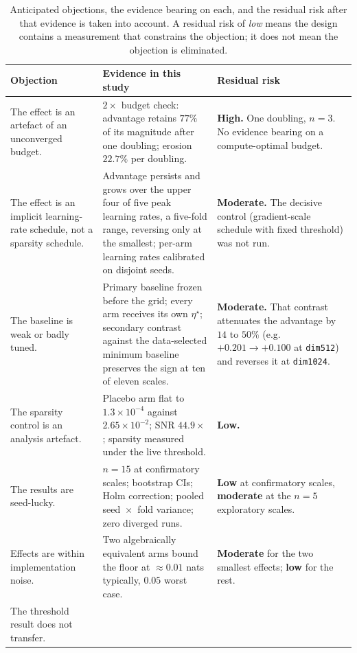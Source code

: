 \documentclass[final,5p,times,twocolumn]{elsarticle}
\theoremstyle{remark}
\begin{document}
\begin{table}[!tb]
\centering
\small
\caption{Anticipated objections, the evidence bearing on each, and the
residual risk after that evidence is taken into account. A residual risk of
\emph{low} means the design contains a measurement that constrains the
objection; it does not mean the objection is eliminated.}
\label{tab:threats}
\begin{tabular}{@{}p{3.0cm}p{4.9cm}p{4.3cm}@{}}
\toprule
Objection & Evidence in this study & Residual risk \\
\midrule
The effect is an artefact of an unconverged budget. &
$2\times$ budget check: advantage retains $77\%$ of its magnitude after one
doubling; erosion $22.7\%$ per doubling. &
\textbf{High.} One doubling, $n=3$. No evidence bearing on a compute-optimal
budget. \\
\addlinespace
The effect is an implicit learning-rate schedule, not a sparsity schedule. &
Advantage persists and grows over the upper four of five peak learning rates,
a five-fold range, reversing only at the smallest; per-arm
learning rates calibrated on disjoint seeds. &
\textbf{Moderate.} The decisive control (gradient-scale schedule with fixed
threshold) was not run. \\
\addlinespace
The baseline is weak or badly tuned. &
Primary baseline frozen before the grid; every arm receives its own
$\eta^\star$; secondary contrast against the data-selected minimum baseline
preserves the sign at ten of eleven scales. &
\textbf{Moderate.} That contrast attenuates the advantage by $14$ to $50\%$
(e.g.\ $+0.201 \to +0.100$ at \texttt{dim512}) and reverses it at
\texttt{dim1024}. \\
\addlinespace
The sparsity control is an analysis artefact. &
Placebo arm flat to $1.3\times 10^{-4}$ against $2.65\times 10^{-2}$; SNR
$44.9\times$; sparsity measured under the live threshold. &
\textbf{Low.} \\
\addlinespace
The results are seed-lucky. &
$n=15$ at confirmatory scales; bootstrap CIs; Holm correction; pooled
seed~$\times$~fold variance; zero diverged runs. &
\textbf{Low} at confirmatory scales, \textbf{moderate} at the $n=5$
exploratory scales. \\
\addlinespace
Effects are within implementation noise. &
Two algebraically equivalent arms bound the floor at $\approx 0.01$ nats
typically, $0.05$ worst case. &
\textbf{Moderate} for the two smallest effects; \textbf{low} for the rest. \\
\addlinespace
The threshold result does not transfer. &

\end{tabular}
\end{table}
\end{document}
